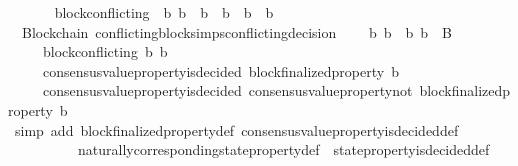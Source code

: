 \begin{isabellebody}
\ \ \isanewline
\ \ \ \ {\isachardoublequoteopen}block{\isacharunderscore}conflicting\ {\isacharequal}\ {\isacharparenleft}{\isasymlambda}{\isacharparenleft}b{}{\isacharcomma}\ b{}{\isacharparenright}{\isachardot}\ {\isasymnot}\ {\isacharparenleft}b{}\ {\isasymdownharpoonright}\ b{}\ {\isasymor}\ b{}\ {\isasymdownharpoonright}\ b{}{\isacharparenright}{\isacharparenright}{\isachardoublequoteclose}\isanewline
\isanewline
{}\isamarkupfalse%
\ {\isacharparenleft}\ Blockchain{\isacharparenright}\ conflicting{\isacharunderscore}blocks{\isacharunderscore}imps{\isacharunderscore}conflicting{\isacharunderscore}decision\ {\isacharcolon}\isanewline
\ \ {\isachardoublequoteopen}{\isasymforall}\ b{}\ b{}\ {\isasymsigma}{\isachardot}\ {\isacharbraceleft}b{}{\isacharcomma}\ b{}{\isacharbraceright}\ {\isasymsubseteq}\ B\ {\isasymand}\ {\isasymsigma}\ {\isasymin}\ {\isasymSigma}\ \isanewline
\ \ \ \ {\isasymlongrightarrow}\ block{\isacharunderscore}conflicting\ {\isacharparenleft}b{}{\isacharcomma}\ b{}{\isacharparenright}\ \isanewline
\ \ \ \ {\isasymlongrightarrow}\ consensus{\isacharunderscore}value{\isacharunderscore}property{\isacharunderscore}is{\isacharunderscore}decided\ {\isacharparenleft}block{\isacharunderscore}finalized{\isacharunderscore}property\ b{}{\isacharcomma}\ {\isasymsigma}{\isacharparenright}\ \isanewline
\ \ \ \ {\isasymlongrightarrow}\ consensus{\isacharunderscore}value{\isacharunderscore}property{\isacharunderscore}is{\isacharunderscore}decided\ {\isacharparenleft}consensus{\isacharunderscore}value{\isacharunderscore}property{\isacharunderscore}not\ {\isacharparenleft}block{\isacharunderscore}finalized{\isacharunderscore}property\ b{}{\isacharparenright}{\isacharcomma}\ {\isasymsigma}{\isacharparenright}{\isachardoublequoteclose}\isanewline
%
\isadelimproof
\ \ %
\endisadelimproof
%
\isatagproof
{}\isamarkupfalse%
\ {\isacharparenleft}simp\ add{\isacharcolon}\ block{\isacharunderscore}finalized{\isacharunderscore}property{\isacharunderscore}def\ consensus{\isacharunderscore}value{\isacharunderscore}property{\isacharunderscore}is{\isacharunderscore}decided{\isacharunderscore}def\isanewline
\ \ \ \ \ \ \ \ \ \ naturally{\isacharunderscore}corresponding{\isacharunderscore}state{\isacharunderscore}property{\isacharunderscore}def\ \ state{\isacharunderscore}property{\isacharunderscore}is{\isacharunderscore}decided{\isacharunderscore}def{\isacharparenright}\isanewline

\end{isabellebody}
